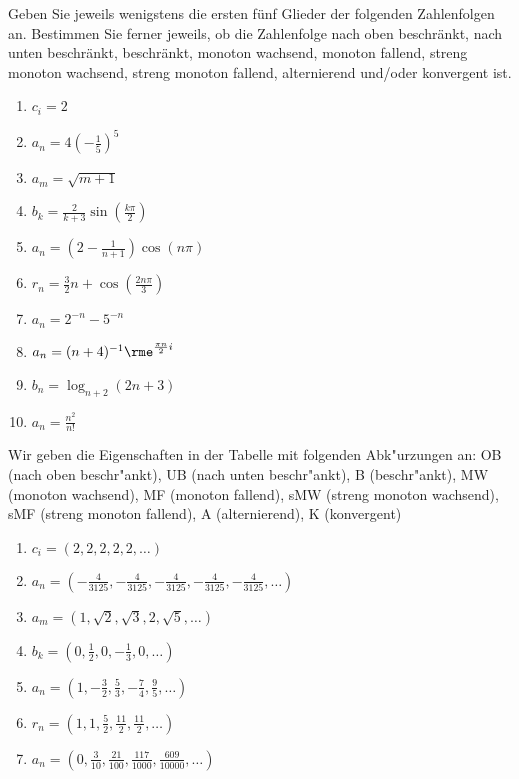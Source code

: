 \documentclass[12pt,answers]{exam}
\begin{document}
\begin{questions}

Geben Sie jeweils wenigstens die ersten fünf Glieder der folgenden Zahlenfolgen an. Bestimmen Sie ferner jeweils, ob die Zahlenfolge nach oben beschränkt, nach unten beschränkt, beschränkt, monoton wachsend, monoton fallend, streng monoton wachsend, streng monoton fallend, alternierend und/oder konvergent ist.\\
\parbox{0.5\textwidth}{\begin{enumerate}
\item $c_i=2$
\item $a_n=4\left(-\frac{1}{5}\right)^5$
\item $a_m=\sqrt{m+1}$
\item $b_k=\frac{2}{k+3}\sin\left(\frac{k\pi}{2}\right)$
\item $a_n=\left(2-\frac{1}{n+1}\right)\cos(n\pi)$
\end{enumerate}}\parbox{0.5\textwidth}{\begin{enumerate}\setcounter{enumi}{5}
\item $r_n=\frac{3}{2}n+\cos\left(\frac{2 n \pi}{3}\right)$
\item $a_n=2^{-n}-5^{-n}$
\item $a_n=(n+4)^{-1}\rme^{\frac{\pi n}{2}i}$
\item $b_n=\log_{n+2}(2n+3)$ 
\item $a_n=\frac{n^2}{n!}$
\end{enumerate}}
\begin{solution} Wir geben die Eigenschaften in der Tabelle mit folgenden Abk"urzungen an: OB (nach oben beschr"ankt), UB (nach unten beschr"ankt), B (beschr"ankt), MW (monoton wachsend), MF (monoton fallend), sMW (streng monoton wachsend), sMF (streng monoton fallend), A (alternierend), K (konvergent)
\begin{enumerate}
\item $c_i=(2,2,2,2,2,\dots)$
\item $a_n=(-\frac{4}{3125},-\frac{4}{3125},-\frac{4}{3125},-\frac{4}{3125},
-\frac{4}{3125},\dots)$
\item $a_m=(1,\sqrt{2},\sqrt{3},2,\sqrt{5},\dots)$
\item $b_k=(0,\frac{1}{2},0,-\frac{1}{3},0,\dots)$
\item $a_n=(1,-\frac{3}{2},\frac{5}{3},-\frac{7}{4},\frac{9}{5},\dots)$
\item $r_n=(1,1,\frac{5}{2},\frac{11}{2},\frac{11}{2},\dots)$
\item $a_n=(0,\frac{3}{10},\frac{21}{100},\frac{117}{1000},\frac{609}{10000},\dots)$

\end{enumerate}
\end{solution}
\end{questions}
\end{document}
